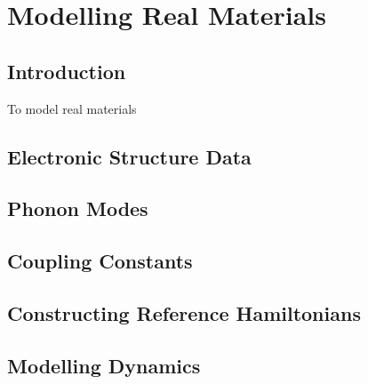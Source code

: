 
\chapter{Modelling Real Materials} %

\label{Chapter5} %


\section{Introduction}

To model real materials

\section{Electronic Structure Data}

\section{Phonon Modes}

\section{Coupling Constants}

\section{Constructing Reference Hamiltonians}

\section{Modelling Dynamics}


